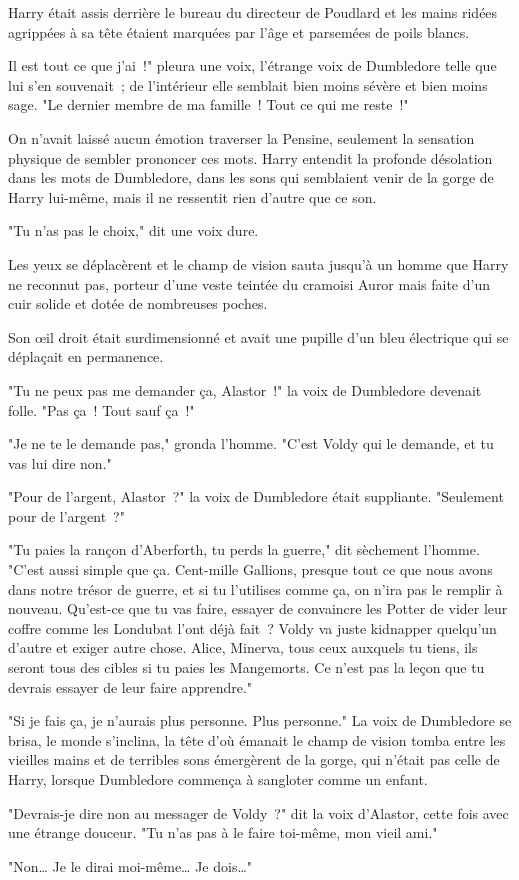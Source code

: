 \begin{em}
Harry était assis derrière le bureau du directeur de Poudlard et les mains ridées agrippées à sa tête étaient marquées par l'âge et parsemées de poils blancs.

Il est tout ce que j'ai~!" pleura une voix, l'étrange voix de Dumbledore telle que lui s'en souvenait~; de l'intérieur elle semblait bien moins sévère et bien moins sage. "Le dernier membre de ma famille~! Tout ce qui me reste~!"

On n'avait laissé aucun émotion traverser la Pensine, seulement la sensation physique de sembler prononcer ces mots. Harry entendit la profonde désolation dans les mots de Dumbledore, dans les sons qui semblaient venir de la gorge de Harry lui-même, mais il ne ressentit rien d'autre que ce son.

"Tu n'as pas le choix," dit une voix dure.

Les yeux se déplacèrent et le champ de vision sauta jusqu'à un homme que Harry ne reconnut pas, porteur d'une veste teintée du cramoisi Auror mais faite d'un cuir solide et dotée de nombreuses poches.

Son œil droit était surdimensionné et avait une pupille d'un bleu électrique qui se déplaçait en permanence.

"Tu ne peux pas me demander ça, Alastor~!" la voix de Dumbledore devenait folle. "Pas ça~! Tout sauf ça~!"

"Je ne te le demande pas," gronda l'homme. "C'est Voldy qui le demande, et tu vas lui dire non."

"Pour de l'argent, Alastor~?" la voix de Dumbledore était suppliante. "Seulement pour de l'argent~?"

"Tu paies la rançon d'Aberforth, tu perds la guerre," dit sèchement l'homme. "C'est aussi simple que ça. Cent-mille Gallions, presque tout ce que nous avons dans notre trésor de guerre, et si tu l'utilises comme ça, on n'ira pas le remplir à nouveau. Qu'est-ce que tu vas faire, essayer de convaincre les Potter de vider leur coffre comme les Londubat l'ont déjà fait~? Voldy va juste kidnapper quelqu'un d'autre et exiger autre chose. Alice, Minerva, tous ceux auxquels tu tiens, ils seront tous des cibles si tu paies les Mangemorts. Ce n'est pas la leçon que tu devrais essayer de leur faire apprendre."

"Si je fais ça, je n'aurais plus personne. Plus personne." La voix de Dumbledore se brisa, le monde s'inclina, la tête d'où émanait le champ de vision tomba entre les vieilles mains et de terribles sons émergèrent de la gorge, qui n'était pas celle de Harry, lorsque Dumbledore commença à sangloter comme un enfant.

"Devrais-je dire non au messager de Voldy~?" dit la voix d'Alastor, cette fois avec une étrange douceur. "Tu n'as pas à le faire toi-même, mon vieil ami."

"Non… Je le dirai moi-même… Je dois…"
\end{em}


